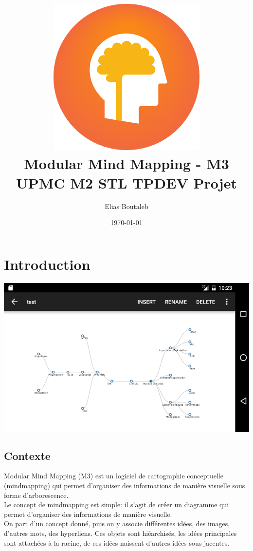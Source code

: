 \documentclass[11pt,a4paper,margin=0.5in]{report}
\title{ \includegraphics[scale=0.33]{m3.png} \\[0.25in]Modular Mind Mapping - M3 \\ UPMC M2 STL TPDEV Projet}
\author{Elias Boutaleb}
\date{\today}
\begin{document}
\maketitle
\tableofcontents

\chapter{Introduction}

\begin{center}
\includegraphics[scale=0.5]{mm.png} \\[0.25in]
\end{center}

\section{Contexte}

Modular Mind Mapping (M3) est un logiciel de cartographie conceptuelle (mindmapping) qui permet d'organiser des informations de manière
visuelle sous forme d'arborescence. \\[0.25in]

Le concept de mindmapping est simple: il s'agit de créer un diagramme qui permet d'organiser des informations de
manière visuelle. \\
On part d'un concept donné, puis on y associe différentes idées, des images, d'autres mots, des hyperliens.
Ces objets sont hiéarchisés, les idées principales sont attachées à la racine, de ces idées naissent d'autres idées sous-jacentes.
\end{document}
